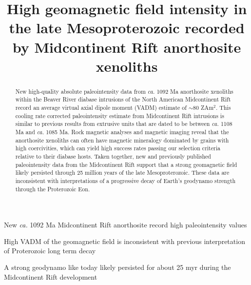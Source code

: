 \documentclass[draft]{agujournal2019}
\begin{document}
\title{High geomagnetic field intensity in the late Mesoproterozoic recorded by Midcontinent Rift anorthosite xenoliths}





\begin{keypoints}
\item New \textit{ca.} 1092 Ma Midcontinent Rift anorthosite record high paleointensity values
\item High VADM of the geomagnetic field is inconsistent with previous interpretation of Proterozoic long term decay
\item A strong geodynamo like today likely persisted for about 25 myr during the Midcontinent Rift development
\end{keypoints}





\begin{abstract}
New high-quality absolute paleointensity data from \textit{ca.} 1092 Ma anorthosite xenoliths within the Beaver River diabase intrusions of the North American Midcontinent Rift record an average virtual axial dipole moment (VADM) estimate of $\sim$80 ZAm$^2$. This cooling rate corrected paleointensity estimate from Midcontinent Rift intrusions is similar to previous results from extrusive units that are dated to be between \textit{ca.} 1108 Ma and \textit{ca.} 1085 Ma. Rock magnetic analyses and magnetic imaging reveal that the anorthosite xenoliths can often have magnetic mineralogy dominated by grains with high coercivities, which can yield high success rates passing our selection criteria relative to their diabase hosts. Taken together, new and previously published paleointensity data from the Midcontinent Rift support that a strong geomagnetic field likely persisted through 25 million years of the late Mesoproterozoic. These data are inconsistent with interpretations of a progressive decay of Earth's geodynamo strength through the Proterozoic Eon. 

\end{abstract}
\end{document}
